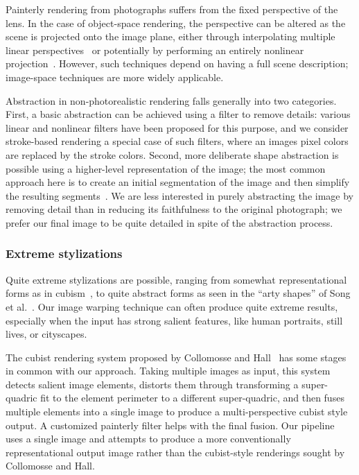 Painterly rendering from photographs suffers from the fixed perspective of the lens. In the case of object-space rendering, the perspective can be altered as the scene is projected onto the image plane, either through interpolating multiple linear perspectives~\cite{freshperspective} or potentially by performing an entirely nonlinear projection~\cite{Brosz,ryan}. However, such techniques depend on having a full scene description; image-space techniques are more widely applicable.

Abstraction in non-photorealistic rendering falls generally into two categories. First, a basic abstraction can be achieved using a filter to remove details: various linear and nonlinear filters have been proposed for this purpose, and we consider stroke-based rendering a special case of such filters, where an image\textquotesingle s pixel colors are replaced by the stroke colors.  Second, more deliberate shape abstraction is possible using a higher-level representation of the image; the most common approach here is to create an initial segmentation of the image and then simplify the resulting segments~\cite{glass,decarlo,colorsketch}. We are less interested in purely abstracting the image by removing detail than in reducing its faithfulness to the original photograph; we prefer our final image to be quite detailed in spite of the abstraction process.

\subsubsection{Extreme stylizations}
Quite extreme stylizations are possible, ranging from somewhat representational forms as in cubism~\cite{cubism}, to quite abstract forms as seen in the “arty shapes” of Song et al.~\cite{artyshapes}. Our image warping technique can often produce quite extreme results, especially when the input has strong salient features, like human portraits, still lives, or cityscapes.

The cubist rendering system proposed by Collomosse and Hall~\cite{cubism} has some stages in common with our approach. Taking multiple images as input, this system detects salient image elements, distorts them through transforming a super-quadric fit to the element perimeter to a different super-quadric, and then fuses multiple elements into a single image to produce a multi-perspective cubist style output. A customized painterly filter helps with the final fusion. Our pipeline uses a single image and attempts to produce a more conventionally representational output image rather than the cubist-style renderings sought by Collomosse and Hall.


